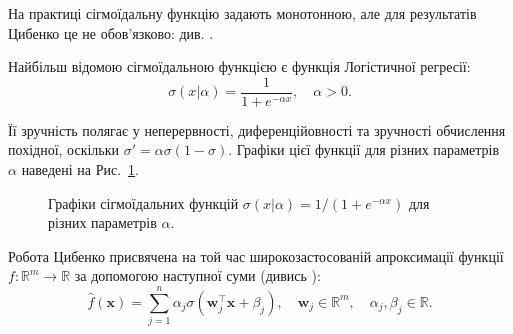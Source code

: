 \begin{remark}
	На практиці сігмоїдальну функцію задають монотонною, але для результатів
	Цибенко це не обов'язково: див. \cite{cybenko}.
\end{remark}

\begin{example}
	Найбільш відомою сігмоїдальною функцією є функція Логістичної регресії:
	\begin{equation}
		\sigma(x|\alpha) = \frac{1}{1+e^{-\alpha x}}, \quad \alpha > 0.
	\end{equation}

	Її зручність полягає у неперервності, диференційовності та зручності
	обчислення похідної, оскільки $\sigma' = \alpha\sigma(1-\sigma)$.
	Графіки цієї функції для різних параметрів $\alpha$ наведені на
	Рис.~\ref{fig:sigmoids}.
\end{example}

\begin{figure}
\centering
{}
\caption{Графіки сігмоїдальних функцій $\sigma(x|\alpha)=1/(1+e^{-\alpha x})$ для різних параметрів $\alpha$.}
\label{fig:sigmoids}
\end{figure}

Робота Цибенко присвячена на той час широкозастосованій апроксимації функції $f:
\mathbb{R}^m \to \mathbb{R}$ за допомогою наступної суми (дивись
\cite{old-nets}):
\begin{equation}\label{eq:cybenko-g}
	\widehat{f}(\mathbf{x}) = \sum_{j=1}^n \alpha_j \sigma(\boldsymbol{w}_j^{\top}\mathbf{x} + \beta_j), \quad \boldsymbol{w}_j \in \mathbb{R}^m, \quad \alpha_j,\beta_j \in \mathbb{R}.
\end{equation}

